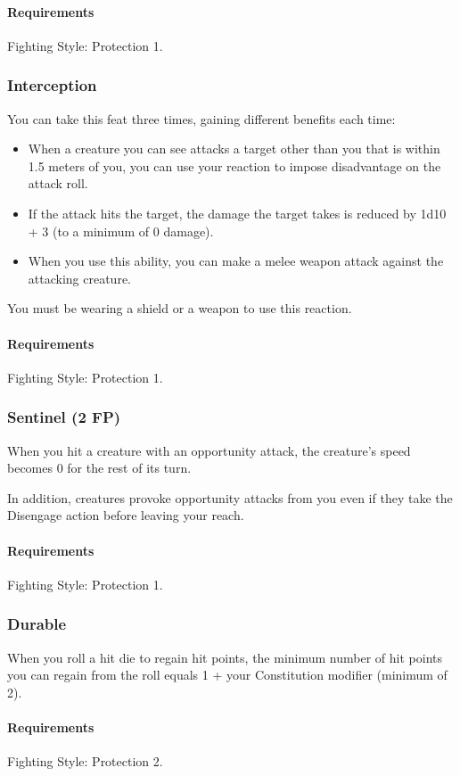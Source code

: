     \paragraph{Requirements} Fighting Style: Protection 1.
\subsubsection{Interception} \label{feat::interception}
    You can take this feat three times, gaining different benefits each time:
    \begin{itemize}
        \item When a creature you can see attacks a target other than you that is within 1.5 meters of you, you can use your reaction to impose disadvantage on the attack roll.
        \item If the attack hits the target, the damage the target takes is reduced by 1d10 + 3 (to a minimum of 0 damage).
        \item When you use this ability, you can make a melee weapon attack against the attacking creature.
    \end{itemize}
    You must be wearing a shield or a weapon to use this reaction.
    \paragraph{Requirements} Fighting Style: Protection 1.
\subsubsection{Sentinel (2 FP)} \label{feat::sentinel}
    When you hit a creature with an opportunity attack, the creature's speed becomes 0 for the rest of its turn.

    In addition, creatures provoke opportunity attacks from you even if they take the Disengage action before leaving your reach.
    \paragraph{Requirements} Fighting Style: Protection 1.
\subsubsection{Durable} \label{feat::durable}
    When you roll a hit die to regain hit points, the minimum number of hit points you can regain from the roll equals 1 + your Constitution modifier (minimum of 2).
    \paragraph{Requirements} Fighting Style: Protection 2.
